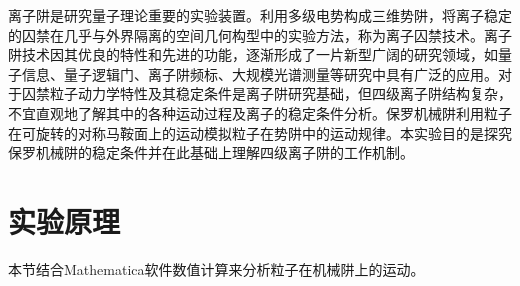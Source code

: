 \documentclass{WHUReport}
\begin{document}
\begin{multicols}{2}
	离子阱是研究量子理论重要的实验装置。利用多级电势构成三维势阱，将离子稳定的囚禁在几乎与外界隔离的空间几何构型中的实验方法，称为离子囚禁技术。离子阱技术因其优良的特性和先进的功能，逐渐形成了一片新型广阔的研究领域，如量子信息、量子逻辑门、离子阱频标、大规模光谱测量等研究中具有广泛的应用。对于囚禁粒子动力学特性及其稳定条件是离子阱研究基础，但四级离子阱结构复杂，不宜直观地了解其中的各种运动过程及离子的稳定条件分析。保罗机械阱利用粒子在可旋转的对称马鞍面上的运动模拟粒子在势阱中的运动规律。本实验目的是探究保罗机械阱的稳定条件并在此基础上理解四级离子阱的工作机制。
	\section{实验原理}
	本节结合Mathematica软件数值计算来分析粒子在机械阱上的运动。

\end{multicols}
\end{document}
